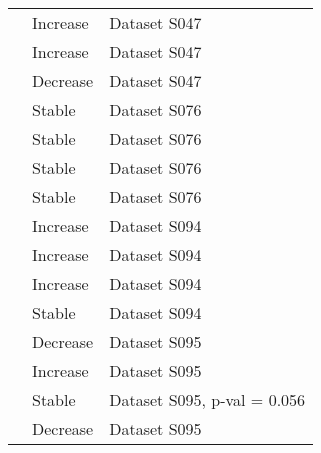 \documentclass[
  12pt,
  oneside]{report}
\begin{document}
\begin{landscape}
\begin{longtable}[t]{ll>{\raggedright\arraybackslash}p{40em}}
\cite{pilotto_meta-analysis_2020} & Increase & Dataset \vphantom{1} S047\\
\addlinespace
\cite{pilotto_meta-analysis_2020} & Increase & Dataset S047\\
\cite{pilotto_meta-analysis_2020} & Decrease & Dataset S047\\
\cite{pilotto_meta-analysis_2020} & Stable & Dataset \vphantom{3} S076\\
\cite{pilotto_meta-analysis_2020} & Stable & Dataset \vphantom{2} S076\\
\cite{pilotto_meta-analysis_2020} & Stable & Dataset \vphantom{1} S076\\
\addlinespace
\cite{pilotto_meta-analysis_2020} & Stable & Dataset S076\\
\cite{pilotto_meta-analysis_2020} & Increase & Dataset \vphantom{2} S094\\
\cite{pilotto_meta-analysis_2020} & Increase & Dataset \vphantom{1} S094\\
\cite{pilotto_meta-analysis_2020} & Increase & Dataset S094\\
\cite{pilotto_meta-analysis_2020} & Stable & Dataset S094\\
\addlinespace
\cite{pilotto_meta-analysis_2020} & Decrease & Dataset \vphantom{1} S095\\
\cite{pilotto_meta-analysis_2020} & Increase & Dataset S095\\
\cite{pilotto_meta-analysis_2020} & Stable & Dataset S095, p-val = 0.056\\
\cite{pilotto_meta-analysis_2020} & Decrease & Dataset S095\\*
\end{longtable}
\endgroup{}
\end{landscape}

\singlespacing 


\renewcommand\bibname{References}
  
\end{document}
